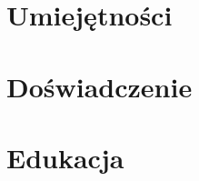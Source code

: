 \documentclass[a4paper,11pt]{article}
\begin{document}


\section{Umiejętności}


\section{Doświadczenie}


\section{Edukacja}

\end{document}
